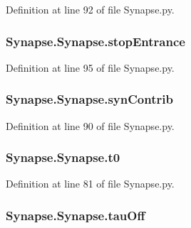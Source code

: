 Definition at line 92 of file Synapse.\-py.

\hypertarget{class_synapse_1_1_synapse_aac4c50cca15e42396f1bfff761693696}{
\subsubsection[{stop\-Entrance}]{\setlength{\rightskip}{0pt plus 5cm}Synapse.\-Synapse.\-stop\-Entrance}}\label{class_synapse_1_1_synapse_aac4c50cca15e42396f1bfff761693696}


Definition at line 95 of file Synapse.\-py.

\hypertarget{class_synapse_1_1_synapse_ac9fc1da99a88f8dd286d3ff3ce484b85}{
\subsubsection[{syn\-Contrib}]{\setlength{\rightskip}{0pt plus 5cm}Synapse.\-Synapse.\-syn\-Contrib}}\label{class_synapse_1_1_synapse_ac9fc1da99a88f8dd286d3ff3ce484b85}


Definition at line 90 of file Synapse.\-py.

\hypertarget{class_synapse_1_1_synapse_ad0adf1cb832bd7ce7918f2779171d7d7}{
\subsubsection[{t0}]{\setlength{\rightskip}{0pt plus 5cm}Synapse.\-Synapse.\-t0}}\label{class_synapse_1_1_synapse_ad0adf1cb832bd7ce7918f2779171d7d7}


Definition at line 81 of file Synapse.\-py.

\hypertarget{class_synapse_1_1_synapse_afd5638a223c3fdcc672002dbced7bed0}{
\subsubsection[{tau\-Off}]{\setlength{\rightskip}{0pt plus 5cm}Synapse.\-Synapse.\-tau\-Off}}\label{class_synapse_1_1_synapse_afd5638a223c3fdcc672002dbced7bed0}


